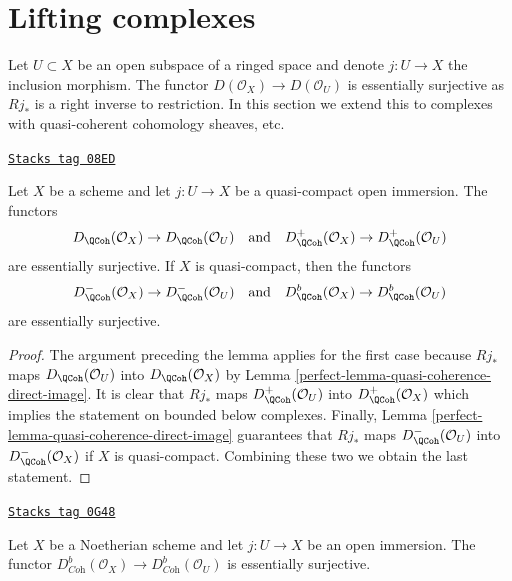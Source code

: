 \section{Lifting complexes}
\label{perfect-section-lift}
Let $U \subset X$ be an open subspace of a ringed space
and denote $j : U \to X$ the inclusion morphism. The functor
$D(\mathcal{O}_X) \to D(\mathcal{O}_U)$ is essentially surjective as
$Rj_*$ is a right inverse to restriction.
In this section we extend this to complexes with quasi-coherent cohomology
sheaves, etc.

\begin{lemma}
\label{perfect-lemma-lift-quasi-coherent}
\href{https://stacks.math.columbia.edu/tag/08ED}{\texttt{Stacks tag 08ED}}

Let $X$ be a scheme and let $j : U \to X$ be a quasi-compact
open immersion. The functors
$$
D_\QCoh(\mathcal{O}_X) \to D_\QCoh(\mathcal{O}_U)
\quad\text{and}\quad
D^+_\QCoh(\mathcal{O}_X) \to D^+_\QCoh(\mathcal{O}_U)
$$
are essentially surjective. If $X$ is quasi-compact, then the functors
$$
D^-_\QCoh(\mathcal{O}_X) \to D^-_\QCoh(\mathcal{O}_U)
\quad\text{and}\quad
D^b_\QCoh(\mathcal{O}_X) \to D^b_\QCoh(\mathcal{O}_U)
$$
are essentially surjective.
\end{lemma}

\begin{proof}

The argument preceding the lemma applies for the first case because $Rj_*$
maps $D_\QCoh(\mathcal{O}_U)$ into $D_\QCoh(\mathcal{O}_X)$
by Lemma \ref{perfect-lemma-quasi-coherence-direct-image}.
It is clear that $Rj_*$ maps
$D^+_\QCoh(\mathcal{O}_U)$ into
$D^+_\QCoh(\mathcal{O}_X)$
which implies the statement on bounded below complexes.
Finally, Lemma \ref{perfect-lemma-quasi-coherence-direct-image}
guarantees that $Rj_*$ maps
$D^-_\QCoh(\mathcal{O}_U)$ into
$D^-_\QCoh(\mathcal{O}_X)$
if $X$ is quasi-compact. Combining these two we obtain the last statement.
\end{proof}

\begin{lemma}
\label{perfect-lemma-lift-coherent}
\href{https://stacks.math.columbia.edu/tag/0G48}{\texttt{Stacks tag 0G48}}

Let $X$ be a Noetherian scheme and let $j : U \to X$ be an open immersion.
The functor
$D^b_{\textit{Coh}}(\mathcal{O}_X) \to D^b_{\textit{Coh}}(\mathcal{O}_U)$
is essentially surjective.
\end{lemma}


